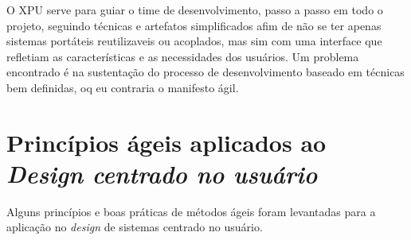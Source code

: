 O XPU serve para guiar o time de desenvolvimento, passo a passo em todo o projeto, seguindo técnicas e artefatos simplificados afim de não se ter apenas sistemas portáteis reutilizaveis ou acoplados, mas sim com uma interface que refletiam as características e as necessidades dos usuários. Um problema encontrado é na sustentação do processo de desenvolvimento baseado em técnicas bem definidas, oq eu contraria o manifesto ágil.


\section{Princípios ágeis aplicados ao \emph{Design centrado no usuário}}

	Alguns princípios e boas práticas de métodos ágeis foram levantadas para a aplicação no \emph{design} de sistemas centrado no usuário.

